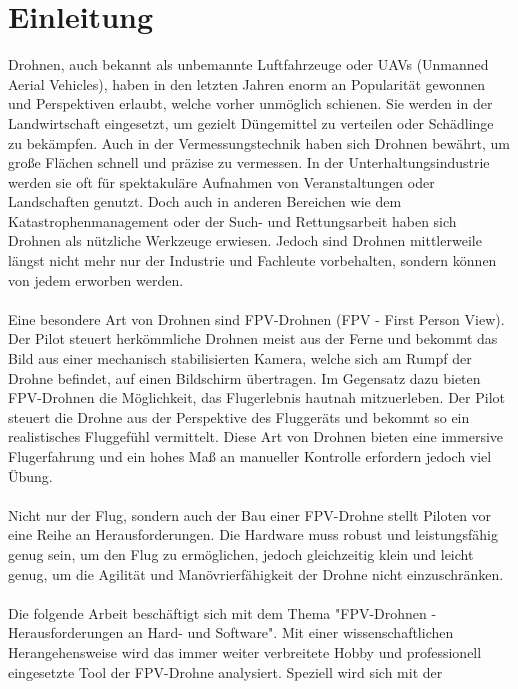 
\section[Einleitung]{Einleitung}
    Drohnen, auch bekannt als unbemannte Luftfahrzeuge oder UAVs (Unmanned Aerial Vehicles),
    haben in den letzten Jahren enorm an Popularität gewonnen und Perspektiven erlaubt, welche
    vorher unmöglich schienen. Sie werden in der Landwirtschaft eingesetzt, um gezielt Düngemittel
    zu verteilen oder Schädlinge zu bekämpfen. Auch in der Vermessungstechnik haben sich Drohnen
    bewährt, um große Flächen schnell und präzise zu vermessen. In der Unterhaltungsindustrie werden
    sie oft für spektakuläre Aufnahmen von Veranstaltungen oder Landschaften genutzt. Doch
    auch in anderen Bereichen wie dem Katastrophenmanagement oder der Such- und Rettungsarbeit
    haben sich Drohnen als nützliche Werkzeuge erwiesen. Jedoch sind Drohnen mittlerweile
    längst nicht mehr nur der Industrie und Fachleute vorbehalten, sondern können von jedem
    erworben werden.\\ 
    \\
    Eine besondere Art von Drohnen sind FPV-Drohnen (FPV - First Person View). Der Pilot
    steuert herkömmliche Drohnen meist aus der Ferne und bekommt das Bild aus einer mechanisch
    stabilisierten Kamera, welche sich am Rumpf der Drohne befindet, auf einen Bildschirm
    übertragen. Im Gegensatz dazu bieten FPV-Drohnen die Möglichkeit, das Flugerlebnis hautnah
    mitzuerleben. Der Pilot steuert die Drohne aus der Perspektive des Fluggeräts und bekommt
    so ein realistisches Fluggefühl vermittelt. Diese Art von Drohnen bieten eine immersive
    Flugerfahrung und ein hohes Maß an manueller Kontrolle erfordern jedoch viel Übung. \\
    \\
    Nicht nur der Flug, sondern auch der Bau einer FPV-Drohne stellt Piloten vor eine Reihe
    an Herausforderungen. Die Hardware muss robust und leistungsfähig genug sein, um den
    Flug zu ermöglichen, jedoch gleichzeitig klein und leicht genug, um die Agilität und
    Manövrierfähigkeit der Drohne nicht einzuschränken.\\
    \\
    Die folgende Arbeit beschäftigt sich mit dem Thema "FPV-Drohnen - Herausforderungen an Hard- und
    Software". Mit einer wissenschaftlichen Herangehensweise wird das immer weiter verbreitete
    Hobby und professionell eingesetzte Tool der FPV-Drohne analysiert. Speziell wird sich mit der
